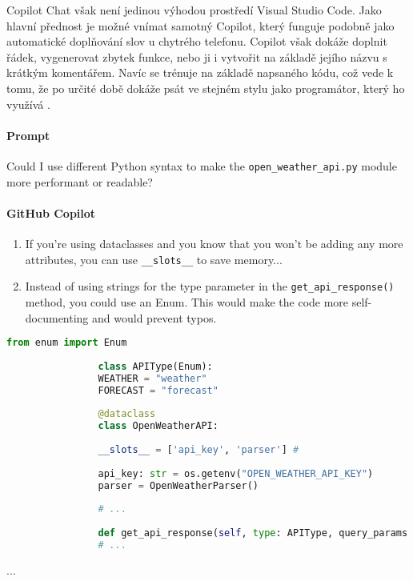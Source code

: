 \documentclass[FM,DP]{tulthesis}
\begin{document}
		Copilot Chat však není jedinou výhodou prostředí Visual Studio Code. Jako hlavní přednost je možné vnímat samotný Copilot, který funguje podobně jako automatické doplňování slov u chytrého telefonu. Copilot však dokáže doplnit řádek, vygenerovat zbytek funkce, nebo ji i vytvořit na základě jejího názvu s krátkým komentářem. Navíc se trénuje na základě napsaného kódu, což vede k tomu, že po určité době dokáže psát ve stejném stylu jako programátor, který ho využívá \cite{gitCopilot}. 
		
		\vspace{0.6em}
		\begin{tcolorbox}[colback=white,colframe=black,title=Úprava výkonnosti třídy v Pythonu]
			\paragraph{Prompt}
			
			Could I use different Python syntax to make the \verb|open_weather_api.py| module more performant or readable?
			
			\vspace{0.6em}
			\paragraph{GitHub Copilot}
			\begin{enumerate}
				\item If you're using dataclasses and you know that you won't be adding any more attributes, you can use \verb|__slots__| to save memory...
				\item Instead of using strings for the type parameter in the \verb|get_api_response()| method, you could use an Enum. This would make the code more self-documenting and would prevent typos.
			\end{enumerate}
			
			\vspace{0.6em}
			
			\begin{lstlisting}[language=Python]
				from enum import Enum
				
				class APIType(Enum):
				WEATHER = "weather"
				FORECAST = "forecast"
				
				@dataclass
				class OpenWeatherAPI:
				
				__slots__ = ['api_key', 'parser'] # 
				
				api_key: str = os.getenv("OPEN_WEATHER_API_KEY")
				parser = OpenWeatherParser()
				
				# ...
				
				def get_api_response(self, type: APIType, query_params: dict[str, float | str]) -> dict:
				# ...
			\end{lstlisting}
			... \cite{dataclass}
		\end{tcolorbox}
		
\end{document}
